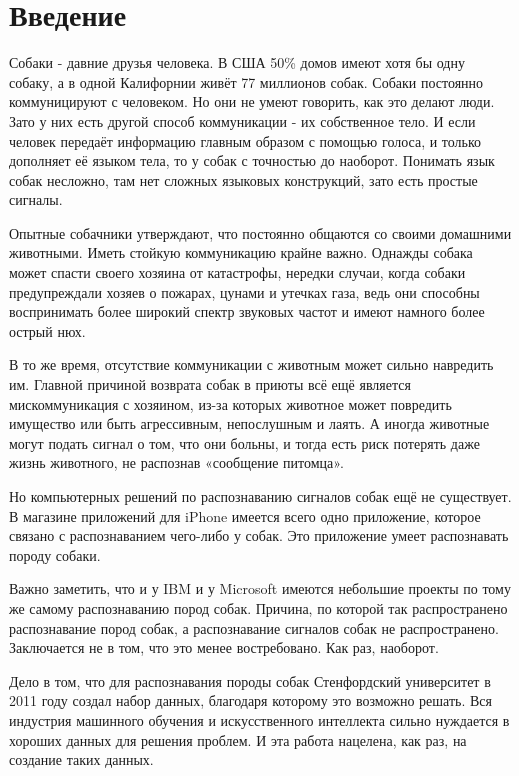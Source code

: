 \chapter*{Введение}							%

Собаки - давние друзья человека. В США 50\% домов имеют хотя бы одну собаку, а в одной Калифорнии живёт 77 миллионов собак. \cite{dog_ownership} Собаки постоянно коммуницируют с человеком. Но они не умеют говорить, как это делают люди. Зато у них есть другой способ коммуникации - их собственное тело. И если человек передаёт информацию главным образом с помощью голоса, и только дополняет её языком тела, то у собак с точностью до наоборот. Понимать язык собак несложно, там нет сложных языковых конструкций, зато есть простые сигналы. 

Опытные собачники утверждают, что постоянно общаются со своими домашними животными. Иметь стойкую коммуникацию крайне важно. Однажды собака может спасти своего хозяина от катастрофы, нередки случаи, когда собаки предупреждали хозяев о пожарах, цунами и утечках газа, ведь они способны воспринимать более широкий спектр звуковых частот и имеют намного более острый нюх. 

В то же время, отсутствие коммуникации с животным может сильно навредить им. Главной причиной возврата собак в приюты всё ещё является мискоммуникация с хозяином, из-за которых животное может повредить имущество или быть агрессивным, непослушным и лаять\cite{reasons_dogs_return_to_shelters}. А иногда животные могут подать сигнал о том, что они больны, и тогда есть риск потерять даже жизнь животного, не распознав «сообщение питомца». 

Но компьютерных решений по распознаванию сигналов собак ещё не существует. В магазине приложений для iPhone имеется всего одно приложение, которое связано с распознаванием чего-либо у собак. Это приложение умеет распознавать породу собаки. 

Важно заметить, что и у IBM\cite{ibm_dog} и у Microsoft\cite{microsoft_dog} имеются небольшие проекты по тому же самому распознаванию пород собак. Причина, по которой так распространено распознавание пород собак, а распознавание сигналов собак не распространено. Заключается не в том, что это менее востребовано. Как раз, наоборот.

Дело в том, что для распознавания породы собак Стенфордский университет в 2011 году создал набор данных, благодаря которому это возможно решать. Вся индустрия машинного обучения и искусственного интеллекта сильно нуждается в хороших данных для решения проблем. И эта работа нацелена, как раз, на создание таких данных. 

